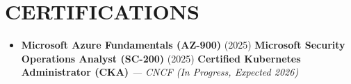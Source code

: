 \documentclass[a4paper,10pt]{article}
\begin{document}
\section{CERTIFICATIONS}
\begin{itemize}[leftmargin=0.15in, label={\textcolor{accent}{\small\textbullet}}, noitemsep, topsep=0.5pt, parsep=0pt, partopsep=0pt]
  \item \textbf{Microsoft Azure Fundamentals (AZ-900)} (2025) \;\textbar\; \textbf{Microsoft Security Operations Analyst (SC-200)} (2025) \;\textbar\; \textbf{Certi{f}ied Kubernetes Administrator (CKA)} \textit{--- CNCF (In Progress, Expected 2026)}
\end{itemize}
\end{document}
